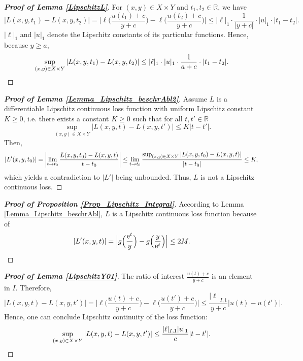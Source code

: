 \documentclass[10pt]{article}
\newcommand{\R}{\mathbb{R}}
\newcommand{\XY}{X \times Y}
\DeclareMathOperator{\e}{e}
\begin{document}
\begin{proof}[\upshape \bfseries Proof of Lemma \ref{LipschitzL}] 
	For $(x,y) \in X \times Y$ and $t_1, t_2 \in \R$, we have
	\begin{equation*}
		|L(x, y, t_1) - L(x, y, t_2)| = \biggl| \ell\biggl( \frac{u(t_1) + c}{y + c}\biggr) -  \ell\biggl( \frac{u(t_2) + c}{y + c}\biggr)\biggr| \leq |\ell|_1 \cdot \frac{1}{|y+c|} \cdot |u|_1 \cdot|t_1 - t_2|.
	\end{equation*}
	$|\ell|_1$ and $|u|_1$ denote the Lipschitz constants of its particular functions.
	Hence, because $y \geq a$,
	\begin{equation*}
		\sup_{(x,y) \in X \times Y} |L(x, y, t_1) - L(x, y, t_2)| \leq |\ell|_1 \cdot |u|_1 \cdot \frac{1}{a + c} \cdot |t_1 - t_2|. \qedhere
	\end{equation*}
\end{proof}
\begin{proof}[\upshape\bfseries Proof of Lemma \ref{Lemma_Lipschitz_beschrAbl2}]
	Assume $L$ is a differentiable Lipschitz continuous loss function with uniform Lipschitz constant $K \geq 0$, i.e. there exists a constant $K \ge 0$ such that for all $t, t' \in \R$
	\begin{equation*}
		\sup_{(x,y) \in X \times Y} |L(x,y,t)-L(x,y,t')| \leq K |t-t'|.
	\end{equation*}
	Then, 
	\begin{equation*}
		|L'(x,y,t_0)| = \biggl|\lim_{t\to t_0} \frac{L(x,y,t_0)-L(x,y,t)}{t-t_0}\biggr| \leq \lim_{t\to t_0} \frac{\sup_{(x,y) \in \XY}|L(x,y,t_0)-L(x,y,t)|}{|t-t_0|} \leq K,\\
	\end{equation*}
	which yields a contradiction to $|L'|$ being unbounded.
	Thus, $L$ is not a Lipschitz continuous loss.
\end{proof}
\begin{proof}[\upshape \textbf{Proof of Proposition \ref{Prop_Lipschitz_Integral}}]
	According to Lemma \ref{Lemma_Lipschitz_beschrAbl}, $L$ is a Lipschitz continuous loss function because of
	\begin{equation*}
		|L'(x,y,t)| = \Bigl|g\Bigl(\frac{\e^t}{y}\Bigr)-g\Bigl(\frac{y}{\e^t}\Bigr)\Bigr| \leq 2M. \qedhere
	\end{equation*}
\end{proof}
\begin{proof}[\upshape \textbf{Proof of Lemma \ref{LipschitzY01}}]
	The ratio of interest $\frac{u(t)+c}{y+c}$ is an element in $I$. 
	Therefore,
	\begin{equation*}
		|L(x,y,t)-L(x,y,t')| = \biggl|\ell\biggl(\frac{u(t)+c}{y+c}\biggr)-\ell\biggl(\frac{u(t')+c}{y+c}\biggr)\biggl| \leq \frac{|\ell|_{I,1}}{y+c} |u(t)-u(t')|.
	\end{equation*}
	Hence, one can conclude Lipschitz continuity of the loss function:
	\begin{equation*}
		\sup_{(x,y) \in \XY} |L(x,y,t)-L(x,y,t')| \leq \frac{|\ell|_{I,1}|u|_1}{c} |t-t'|. \qedhere
	\end{equation*}
\end{proof}
\end{document}
